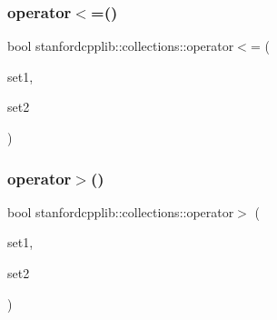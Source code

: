 \subsubsection{\texorpdfstring{operator$<$=()}{operator<=()}}
{\footnotesize\ttfamily bool stanfordcpplib\+::collections\+::operator$<$= (\begin{DoxyParamCaption}\item[{const \mbox{\hyperlink{classstanfordcpplib_1_1collections_1_1GenericSet}{Generic\+Set}}$<$ \mbox{\hyperlink{structstanfordcpplib_1_1collections_1_1SetTraits}{Set\+Traits}} $>$ \&}]{set1,  }\item[{const \mbox{\hyperlink{classstanfordcpplib_1_1collections_1_1GenericSet}{Generic\+Set}}$<$ \mbox{\hyperlink{structstanfordcpplib_1_1collections_1_1SetTraits}{Set\+Traits}} $>$ \&}]{set2 }\end{DoxyParamCaption})}

\mbox{\label{namespacestanfordcpplib_1_1collections_a9a356d27539088a865903569a4e198cb}} 
\subsubsection{\texorpdfstring{operator$>$()}{operator>()}}
{\footnotesize\ttfamily bool stanfordcpplib\+::collections\+::operator$>$ (\begin{DoxyParamCaption}\item[{const \mbox{\hyperlink{classstanfordcpplib_1_1collections_1_1GenericSet}{Generic\+Set}}$<$ \mbox{\hyperlink{structstanfordcpplib_1_1collections_1_1SetTraits}{Set\+Traits}} $>$ \&}]{set1,  }\item[{const \mbox{\hyperlink{classstanfordcpplib_1_1collections_1_1GenericSet}{Generic\+Set}}$<$ \mbox{\hyperlink{structstanfordcpplib_1_1collections_1_1SetTraits}{Set\+Traits}} $>$ \&}]{set2 }\end{DoxyParamCaption})}

\mbox{\label{namespacestanfordcpplib_1_1collections_a74205d7cc4c0eb3e1c7dfc3d9cf333af}} 
